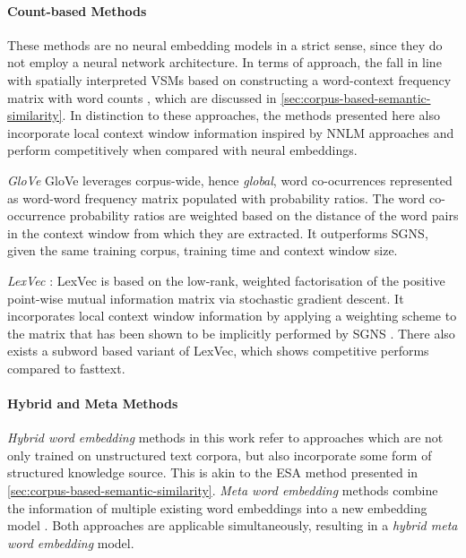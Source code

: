 \documentclass[11pt]{scrreprt}
\let\cite\parencite  %
\begin{document}
\paragraph{Count-based Methods}
These methods are no neural embedding models in a strict sense, since they do not employ a neural network architecture. In terms of approach, the fall in line with spatially interpreted VSMs based on constructing a word-context frequency matrix with word counts \cite{almeidaWordEmbeddingsSurvey2023, turneyFrequencyMeaningVector2010}, which are discussed in \cref{sec:corpus-based-semantic-similarity}. In distinction to these approaches, the methods presented here also incorporate local context window information inspired by NNLM approaches and perform competitively when compared with neural embeddings.

\textit{GloVe} \cite{penningtonGloVeGlobalVectors2014} GloVe leverages corpus-wide, hence \textit{global}, word co-ocurrences represented as word-word frequency matrix populated with probability ratios. The word co-occurrence probability ratios are weighted based on the distance of the word pairs in the context window from which they are extracted. It outperforms SGNS, given the same training corpus, training time and context window size.

\textit{LexVec} \cite{salleMatrixFactorizationUsing2016, salleEnhancingLexVecDistributed2016, salleIncorporatingSubwordInformation2018, salleWhyRoleNegative2019}: LexVec is based on the low-rank, weighted factorisation of the positive point-wise mutual information matrix via stochastic gradient descent. It incorporates local context window information by applying a weighting scheme to the matrix that has been shown to be implicitly performed by SGNS \cite{levyNeuralWordEmbedding2014}. There also exists a subword based variant of LexVec, which shows competitive performs compared to fasttext.


\paragraph{Hybrid and Meta Methods}
\textit{Hybrid word embedding} methods in this work refer to approaches which are not only trained on unstructured text corpora, but also incorporate some form of structured knowledge source. This is akin to the ESA method presented in \cref{sec:corpus-based-semantic-similarity}. \textit{Meta word embedding} methods combine the information of multiple existing word embeddings into a new embedding model \cite{bollegalaSurveyWordMetaEmbedding2022}. Both approaches are applicable simultaneously, resulting in a \textit{hybrid meta word embedding} model.
\end{document}
